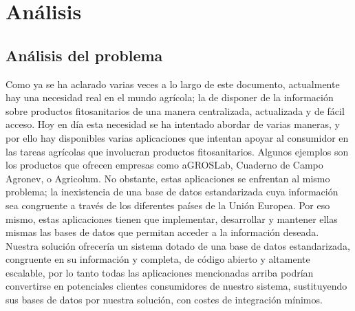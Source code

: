 \chapter{Análisis}
\section{Análisis del problema}
Como ya se ha aclarado varias veces a lo largo de este documento, actualmente hay una necesidad real en el mundo agrícola; la de disponer de la información sobre productos fitosanitarios de una manera centralizada, actualizada y de fácil acceso. Hoy en día esta necesidad se ha intentado abordar de varias maneras, y por ello hay disponibles varias aplicaciones que intentan apoyar al consumidor en las tareas agrícolas que involucran productos fitosanitarios. Algunos ejemplos son los productos que ofrecen empresas como aGROSLab, Cuaderno de Campo Agronev, o Agricolum. No obstante, estas aplicaciones se enfrentan al mismo problema; la inexistencia de una base de datos estandarizada cuya información sea congruente a través de los diferentes países de la Unión Europea. Por eso mismo, estas aplicaciones tienen que implementar, desarrollar y mantener ellas mismas las bases de datos que permitan acceder a la información deseada. Nuestra solución ofrecería un sistema dotado de una base de datos estandarizada, congruente en su información y completa, de código abierto y altamente escalable, por lo tanto todas las aplicaciones mencionadas arriba podrían convertirse en potenciales clientes consumidores de nuestro sistema, sustituyendo sus bases de datos por nuestra solución, con costes de integración mínimos.

